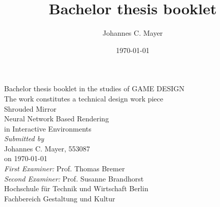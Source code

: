 \documentclass[a4paper, twoside, 10pt]{report}
\title{Bachelor thesis booklet}
\author{Johannes C. Mayer}
\date{\today}
\newcommand\blankpage{\null\thispagestyle{empty}\addtocounter{page}{0}\newpage}
\begin{document}
\begin{titlepage}
\end{titlepage}


\blankpage


\begin{flushleft}
\begin{spacing}{1.5}
{\large
Bachelor thesis booklet in the studies of GAME DESIGN \\
The work constitutes a technical design work piece \\
\vspace*{\fill}
{\Huge Shrouded Mirror} \\
{\Large Neural Network Based Rendering \\ in Interactive Environments \\}
\vspace*{\fill}
\textit{Submitted by} \\
Johannes C. Mayer, 553087 \\
on \today \\
\vspace*{1cm}
\textit{First Examiner:} Prof. Thomas Bremer \\
\textit{Second Examiner:} Prof. Susanne Brandhorst \\
\vspace*{1cm}
Hochschule f\"ur Technik und Wirtschaft Berlin \\
Fachbereich Gestaltung und Kultur \\
}
\end{spacing}
\end{flushleft}



\tableofcontents
\clearpage

\end{document}
